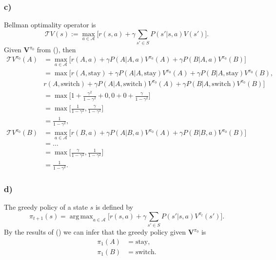 \documentclass[12pt]{article}
\DeclareMathOperator*{\argmax}{arg\,max}
\begin{document}
\subsubsection*{c)}
Bellman optimality operator is
\begin{equation*}
    \mathcal{T}V(s) := \max_{a \in \mathcal{A}} \Big[r(s,a) + \gamma\sum_{s'\in S}P(s'|s,a)V(s')\Big].
\end{equation*}
Given $\mathbf{V}^{\pi_0}$ from (), then
\begin{equation}
    \begin{split}
        \mathcal{T}V^{\pi_0}(A) &= \max_{a \in \mathcal{A}} \Big[r(A,a) + \gamma P(A|A,a)V^{\pi_0}(A) + \gamma P(B|A,a)V^{\pi_0}(B) \Big] \\
        &= \max \Big[r(A,\text{stay}) + \gamma P(A|A,\text{stay})V^{\pi_0}(A) + \gamma P(B|A,\text{stay})V^{\pi_0}(B), \\ &r(A,\text{switch}) + \gamma P(A|A,\text{switch})V^{\pi_0}(A) + \gamma P(B|A,\text{switch})V^{\pi_0}(B)\Big] \\
        &= \max \Big[1 + \frac{\gamma^2}{1-\gamma^2} + 0, 0 + 0 + \frac{\gamma}{1-\gamma^2}\Big] \\
        &= \max \Big[\frac{1}{1-\gamma^2}, \frac{\gamma}{1-\gamma^2}\Big] \\
        &= \frac{1}{1-\gamma^2}, \\
        \mathcal{T}V^{\pi_0}(B) &= \max_{a \in \mathcal{A}} \Big[r(B,a) + \gamma P(A|B,a)V^{\pi_0}(A) + \gamma P(B|B,a)V^{\pi_0}(B) \Big] \\
        &= \dots \\
        &= \max \Big[\frac{\gamma}{1-\gamma^2}, \frac{1}{1-\gamma^2}\Big] \\
        &= \frac{1}{1-\gamma^2}.
    \end{split}
    \label{eq:bellmanop}
\end{equation}
\subsubsection*{d)}
The greedy policy of a state $s$ is defined by
\begin{equation*}
    \pi_{t+1}(s) = \argmax_{a\in\mathcal{A}}\Big[r(s,a) + \gamma \sum_{s'\in S} P(s'|s,a)V^{\pi_t}(s') \Big].
\end{equation*}
By the results of () we can infer that the greedy policy given $\mathbf{V}^{\pi_0}$ is
\begin{equation*}
    \begin{split}
        \pi_1(A) &= \text{stay}, \\
        \pi_1(B) &= \text{switch}.
    \end{split}
\end{equation*}
\end{document}
